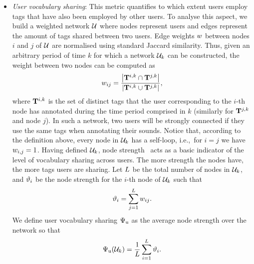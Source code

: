 \begin{itemize}
	\item \textit{User vocabulary sharing}: This metric quantifies to which extent users employ tags that have also been employed by other users. To analyse this aspect, we build a weighted network $\mathcal{U}$ where nodes represent users and edges represent the amount of tags shared between two users. Edge weights $w$ between nodes $i$ and $j$ of $\mathcal{U}$ are normalised using standard Jaccard similarity. Thus, given an arbitrary period of time $k$ for which a network $\mathcal{U}_k$ can be constructed, the weight between two nodes can be computed as
\begin{equation}w_{ij} = \frac{ \left\vert \mathbf{T}^{i,k} \cap \mathbf{T}^{j,k} \right\vert }{ \left\vert \mathbf{T}^{i,k} \cup \mathbf{T}^{j,k} \right\vert }, \label{impact:eq:weight_vocabulary_sharing} \end{equation}
where $\mathbf{T}^{i,k}$ is the set of distinct tags that the user corresponding to the $i$-th node has annotated during the time period comprised in $k$ (similarly for $\mathbf{T}^{j,k}$ and node $j$). 
In such a network, two users will be strongly connected if they use the same tags when annotating their sounds. Notice that, according to the definition above, every node in $\mathcal{U}_k$ has a self-loop, i.e.,~for $i=j$ we have $w_{i,j}=1$. Having defined $\mathcal{U}_k$, node strength~\citep{Barrat2004} acts as a basic indicator of the level of vocabulary sharing across users. The more strength the nodes have, the more tags users are sharing. 
Let $L$ be the total number of nodes in $\mathcal{U}_k$, and $\vartheta_i$ be the node strength for the $i$-th node of $\mathcal{U}_k$ such that
\begin{equation} \vartheta_i = \sum\limits_{j=1}^{L}{w_{ij}}. \end{equation}
We define user vocabulary sharing $\Psi_{\text{u}}$ as the average node strength over the network so that
\begin{equation} \Psi_{\text{u}}(\mathcal{U}_k) = \frac{1}{L}\sum\limits_{i=1}^{L}{\vartheta_i}. \label{impact:eq:user_vocabulary_sharing} \end{equation}


\end{itemize}
